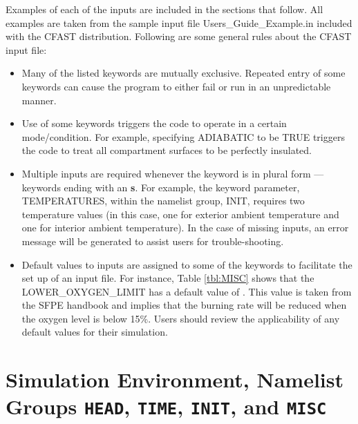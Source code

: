 Examples of each of the inputs are included in the sections that follow.  All examples are taken from the sample input file {\ct Users\_Guide\_Example.in} included with the CFAST distribution. Following are some general rules about the CFAST input file:

\begin{itemize}
\item Many of the listed keywords are mutually exclusive. Repeated entry of some keywords can cause the program to either fail or run in an unpredictable manner.
\item Use of some keywords triggers the code to operate in a certain mode/condition. For example, specifying {\ct ADIABATIC} to be {\ct TRUE} triggers the code to treat all compartment surfaces to be perfectly insulated.
\item Multiple inputs are required whenever the keyword is in plural form --- keywords ending with an \textbf{s}. For example, the keyword parameter, {\ct TEMPERATURES}, within the namelist group, {\ct INIT}, requires two temperature values (in this case, one for exterior ambient temperature and one for interior ambient temperature). In the case of missing inputs, an error message will be generated to assist users for trouble-shooting.
\item Default values to inputs are assigned to some of the keywords to facilitate the set up of an input file. For instance, Table \ref{tbl:MISC} shows that the {\ct LOWER\_OXYGEN\_LIMIT} has a default value of {}. This value is taken from the SFPE handbook \cite{SFPE:2003} and implies that the burning rate will be reduced when the oxygen level is below 15\%. Users should review the applicability of any default values for their simulation.
\end{itemize}


\clearpage

\section{Simulation Environment, Namelist Groups \texorpdfstring{{\tt HEAD}}{HEAD}, \texorpdfstring{{\tt TIME}}{TIME}, \texorpdfstring{{\tt INIT}}{INIT}, and  \texorpdfstring{{\tt MISC}}{MISC}}


